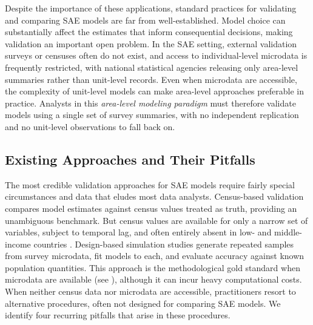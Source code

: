 \documentclass[11pt]{article}
\theoremstyle{plain}
\theoremstyle{definition}
\theoremstyle{remark}
\begin{document}
Despite the importance of these applications, standard practices for validating and comparing SAE models are far from well-established. Model choice can substantially affect the estimates that inform consequential decisions, making validation an important open problem. In the SAE setting, external validation surveys or censuses often do not exist, and access to individual-level microdata is frequently restricted, with national statistical agencies releasing only area-level summaries rather than unit-level records. Even when microdata are accessible, the complexity of unit-level models can make area-level approaches preferable in practice. Analysts in this \textit{area-level modeling paradigm} must therefore validate models using a single set of survey summaries, with no independent replication and no unit-level observations to fall back on.

\subsection{Existing Approaches and Their Pitfalls}

The most credible validation approaches for SAE models require fairly special circumstances and data that eludes most data analysts. Census-based validation compares model estimates against census values treated as truth, providing an unambiguous benchmark. But census values are available for only a narrow set of variables, subject to temporal lag, and often entirely absent in low- and middle-income countries \citep{dong_toward_2025}. Design-based simulation studies generate repeated samples from survey microdata, fit models to each, and evaluate accuracy against known population quantities. This approach is the methodological gold standard when microdata are available (see \citet{molina_small_2010, datta_small_2015}), although it can incur heavy computational costs. When neither census data nor microdata are accessible, practitioners resort to alternative procedures, often not designed for comparing SAE models. We identify four recurring pitfalls that arise in these procedures.
\end{document}
